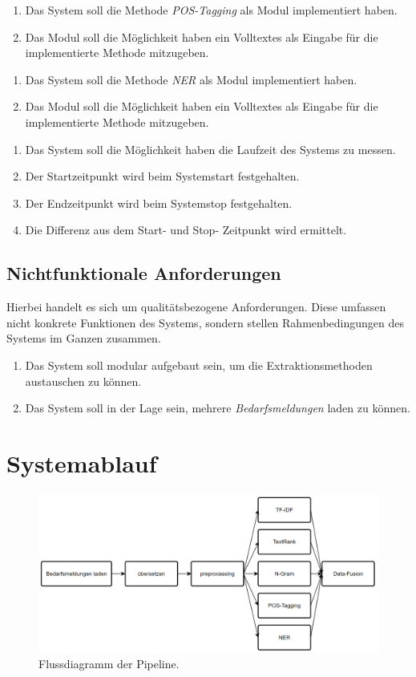 \begin{enumerate}[label=7.\arabic*]
	\item Das System soll die Methode \emph{POS-Tagging} als Modul implementiert haben.
	\item Das Modul soll die Möglichkeit haben ein Volltextes als Eingabe für die implementierte Methode mitzugeben.
\end{enumerate}
\begin{enumerate}[label=8.\arabic*]
	\item Das System soll die Methode \emph{NER} als Modul implementiert haben.
	\item Das Modul soll die Möglichkeit haben ein Volltextes als Eingabe für die implementierte Methode mitzugeben.
\end{enumerate}
\begin{enumerate}[label=8.\arabic*]
	\item Das System soll die Möglichkeit haben die Laufzeit des Systems zu messen.
	\item Der Startzeitpunkt wird beim Systemstart festgehalten.
	\item Der Endzeitpunkt wird beim Systemstop festgehalten.
	\item Die Differenz aus dem Start- und Stop- Zeitpunkt wird ermittelt.
\end{enumerate}
\subsection{Nichtfunktionale Anforderungen}
Hierbei handelt es sich um qualitätsbezogene Anforderungen. Diese umfassen nicht konkrete Funktionen des Systems, sondern stellen Rahmenbedingungen des Systems im Ganzen zusammen.
\begin{enumerate}
	\item Das System soll modular aufgebaut sein, um die Extraktionsmethoden austauschen zu können.
	\item Das System soll in der Lage sein, mehrere \emph{Bedarfsmeldungen} laden zu können.
\end{enumerate}
\newpage
\section{Systemablauf}
\begin{figure}[H]
	\centering  
	\includegraphics[width=\linewidth]{Abbildungen/flowchart.png}
	\caption{Flussdiagramm der Pipeline.}
	\label{fig:flowchart}
\end{figure}\mbox{} \\
